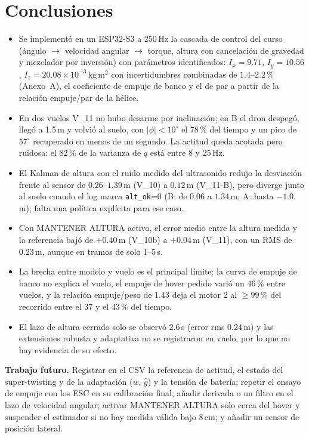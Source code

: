 \section{Conclusiones}
\label{sec:conc}

\begin{itemize}
\item Se implementó en un ESP32-S3 a 250\,Hz la cascada de control del curso (ángulo $\to$ velocidad angular $\to$ torque, altura con cancelación de gravedad y mezclador por inversión) con parámetros identificados: $I_x=9.71$, $I_y=10.56$, $I_z=20.08\times10^{-3}$\,kg\,m$^2$ con incertidumbres combinadas de $1.4$--$2.2$\,\% (Anexo~A), el coeficiente de empuje de banco y el de par a partir de la relación empuje/par de la hélice.
\item En dos vuelos V\_11 no hubo desarme por inclinación; en B el dron despegó, llegó a 1.5\,m y volvió al suelo, con $|\phi|<10^\circ$ el $78$\,\% del tiempo y un pico de $57^\circ$ recuperado en menos de un segundo. La actitud queda acotada pero ruidosa: el $82$\,\% de la varianza de $q$ está entre 8 y 25\,Hz.
\item El Kalman de altura con el ruido medido del ultrasonido redujo la desviación frente al sensor de $0.26$--$1.39$\,m (V\_10) a $0.12$\,m (V\_11-B), pero diverge junto al suelo cuando el log marca \texttt{alt\_ok}=0 (B: de $0.06$ a $1.34$\,m; A: hasta $-1.0$\,m); falta una política explícita para ese caso.
\item Con MANTENER ALTURA activo, el error medio entre la altura medida y la referencia bajó de $+0.40$\,m (V\_10b) a $+0.04$\,m (V\_11), con un RMS de $0.23$\,m, aunque en tramos de solo 1--5\,s.
\item La brecha entre modelo y vuelo es el principal límite: la curva de empuje de banco no explica el vuelo, el empuje de hover pedido varió un $46$\,\% entre vuelos, y la relación empuje/peso de $1.43$ deja el motor 2 al $\ge99$\,\% del recorrido entre el 37 y el 43\,\% del tiempo.
\item El lazo de altura cerrado solo se observó 2.6\,s (error rms $0.24$\,m) y las extensiones robusta y adaptativa no se registraron en vuelo, por lo que no hay evidencia de su efecto.
\end{itemize}

\textbf{Trabajo futuro.} Registrar en el CSV la referencia de actitud, el estado del super-twisting y de la adaptación ($w$, $\hat g$) y la tensión de batería; repetir el ensayo de empuje con los ESC en su calibración final; añadir derivada o un filtro en el lazo de velocidad angular; activar MANTENER ALTURA solo cerca del hover y suspender el estimador si no hay medida válida bajo 8\,cm; y añadir un sensor de posición lateral.
